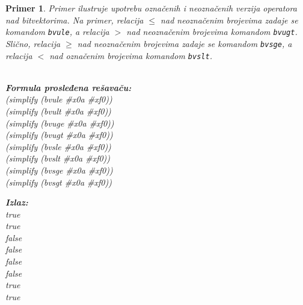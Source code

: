 \documentclass[12pt,oneside]{memoir}
\newtheorem{primer}{Primer}
\begin{document}
\begin{primer} \label{example9} Primer ilustruje upotrebu označenih i neoznačenih verzija operatora nad bitvektorima. Na primer, relacija $\leq$ nad neoznačenim brojevima zadaje se komandom \texttt{bvule}, a relacija $>$ nad neoznačenim brojevima komandom \texttt{bvugt}. Slično, relacija $\geq$ nad neoznačenim brojevima zadaje se komandom \texttt{bvsge}, a relacija $<$ nad označenim brojevima komandom \texttt{bvslt}.
\\ \\ 
\begin{minipage}[b]{0.5\textwidth}
\textbf{Formula prosleđena rešavaču:}
\\(simplify (bvule \#x0a \#xf0))  
\\(simplify (bvult \#x0a \#xf0))  
\\(simplify (bvuge \#x0a \#xf0))  
\\(simplify (bvugt \#x0a \#xf0))  
\\(simplify (bvsle \#x0a \#xf0)) 
\\(simplify (bvslt \#x0a \#xf0))  
\\(simplify (bvsge \#x0a \#xf0))  
\\(simplify (bvsgt \#x0a \#xf0))

\end{minipage}
\hspace{2cm} 
\begin{minipage}[t]{0.5\textwidth}
\vspace{-5.3cm}
\textbf{Izlaz:}
\\true 
\\true 
\\false 
\\false 
\\false 
\\false 
\\true 
\\true
\end{minipage}


\end{primer}
\end{document}

